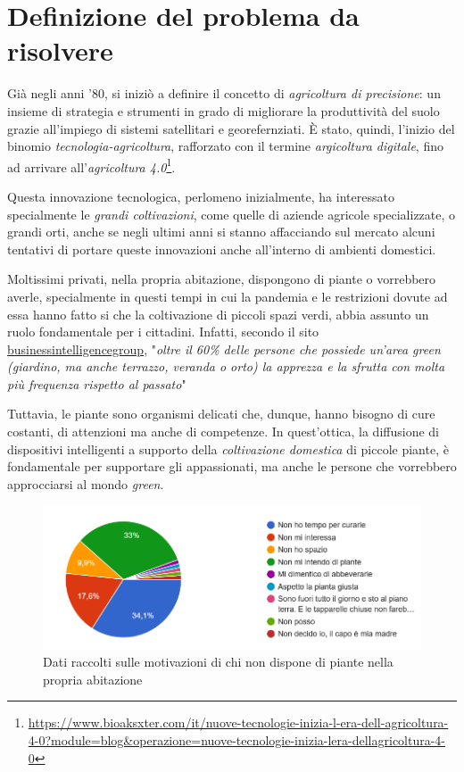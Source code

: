 \section{Definizione del problema da risolvere}

Già negli anni '80, si iniziò a definire il concetto di \textit{agricoltura di precisione}: un insieme di strategia e strumenti in grado di migliorare la produttività del suolo grazie all'impiego di sistemi satellitari e georefernziati. \`E stato, quindi, l'inizio del binomio \textit{tecnologia-agricoltura}, rafforzato con il termine \textit{argicoltura digitale}, fino ad arrivare all'\textit{agricoltura 4.0}\footnote{\url{https://www.bioaksxter.com/it/nuove-tecnologie-inizia-l-era-dell-agricoltura-4-0?module=blog&operazione=nuove-tecnologie-inizia-lera-dellagricoltura-4-0}}.

Questa innovazione tecnologica, perlomeno inizialmente, ha interessato specialmente le \textit{grandi coltivazioni}, come quelle di aziende agricole specializzate, o grandi orti, anche se negli ultimi anni si stanno affacciando sul mercato alcuni tentativi di portare queste innovazioni anche all'interno di ambienti domestici.

Moltissimi privati, nella propria abitazione, dispongono di piante o vorrebbero averle, specialmente in questi tempi in cui la pandemia e le restrizioni dovute ad essa hanno fatto si che la coltivazione di piccoli spazi verdi, abbia assunto un ruolo fondamentale per i cittadini. Infatti, secondo il sito \href{https://www.businessintelligencegroup.it/quanto-vale-il-mercato-del-giardinaggio-in-italia/}{businessintelligencegroup}, "\textit{oltre il 60\% delle persone che possiede un’area green (giardino, ma anche terrazzo, veranda o orto) la apprezza e la sfrutta con molta più frequenza rispetto al passato}"

Tuttavia, le piante sono organismi delicati che, dunque, hanno bisogno di cure costanti, di attenzioni ma anche di competenze. In quest'ottica, la diffusione di dispositivi intelligenti a supporto della \textit{coltivazione domestica} di piccole piante, è fondamentale per supportare gli appassionati, ma anche le persone che vorrebbero approcciarsi al mondo \textit{green}.

\begin{figure}[h!]
	\centering
	\includegraphics[width=\columnwidth]{images/torta_perche_no_piante.png}
	\caption{Dati raccolti sulle motivazioni di chi non dispone di piante nella propria abitazione}
	\label{fig:whynot}
\end{figure}

